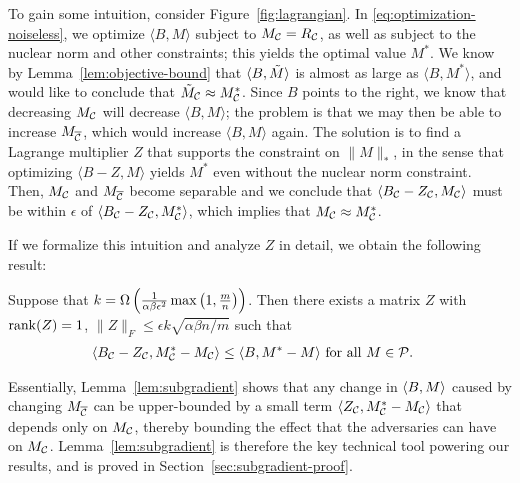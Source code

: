 To gain some intuition, consider 
Figure~\ref{fig:lagrangian}. In \eqref{eq:optimization-noiseless}, we optimize 
$\langle B, M \rangle$ subject to $M_{\mathcal{C}} = R_{\mathcal{C}}$, as well as subject to 
the nuclear norm and other constraints; this yields the optimal value $M^*$. 
We know by Lemma~\ref{lem:objective-bound} that $\langle B, \tilde{M} \rangle$ is almost 
as large as $\langle B, M^* \rangle$, and would like to conclude that 
$\tilde{M}_{\mathcal{C}} \approx M^*_{\mathcal{C}}$. Since $B$ points to the right, we know that 
decreasing $M_{\mathcal{C}}$ will decrease $\langle B, M \rangle$; the problem is that 
we may then be able to increase $M_{\overline{\mathcal{C}}}$, which would increase 
$\langle B, M \rangle$ again. The solution is to find a Lagrange 
multiplier $Z$ that supports 
the constraint on $\|M\|_*$, in the sense that optimizing 
$\langle B-Z, M \rangle$ yields $M^*$ even without the nuclear norm constraint. 
Then, $M_{\mathcal{C}}$ and $M_{\overline{\mathcal{C}}}$ become separable and we conclude that 
$\langle B_{\mathcal{C}} - Z_{\mathcal{C}}, M_{\mathcal{C}} \rangle$ must be within $\epsilon$ of 
$\langle B_{\mathcal{C}} - Z_{\mathcal{C}}, M^*_{\mathcal{C}} \rangle$, which implies that 
$M_{\mathcal{C}} \approx M^*_{\mathcal{C}}$.

If we formalize this intuition and analyze $Z$ in detail, we obtain the 
following result:
\begin{lemma}
\label{lem:subgradient}
Suppose that $k = \Omega\left( \frac{1}{\alpha\beta\epsilon^2}\max\left( 1,\frac{m}{n} \right) \right)$. 
Then there exists a matrix $Z$ with 
$\operatorname{rank}(Z) = 1$, $\|Z\|_F \leq \epsilon k\sqrt{\alpha\beta n/m}$ such that
\begin{align}
\langle B_{\mathcal{C}} - Z_{\mathcal{C}}, M^*_{\mathcal{C}} - M_{\mathcal{C}} \rangle &\leq \langle B, M^* - M \rangle \text{ for all $M \in \mathcal{P}$}.
\end{align}
\end{lemma}
Essentially, Lemma~\ref{lem:subgradient} shows that any change in 
$\langle B, M \rangle$ caused by changing $M_{\overline{\mathcal{C}}}$ can be upper-bounded 
by a small term $\langle Z_{\mathcal{C}}, M^*_{\mathcal{C}} - M_{\mathcal{C}} \rangle$ that depends only 
on $M_{\mathcal{C}}$, thereby bounding the effect that the adversaries can have 
on $M_{\mathcal{C}}$. Lemma~\ref{lem:subgradient} is therefore the key 
technical tool powering our results, and is proved in 
Section~\ref{sec:subgradient-proof}.

